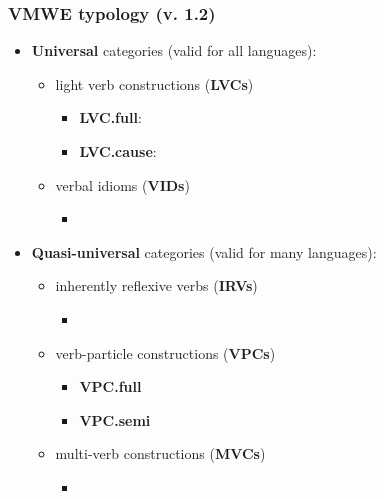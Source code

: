 \documentclass[xcolor=dvipsnames]{beamer}
\begin{document}
\begin{frame}
\begin{frame}
  \vspace*{-5pt}
  \frametitle{VMWE typology (v. 1.2)}

\begin{scriptsize}
\begin{block}{}
\begin{itemize}
\item \textbf{Universal} categories (valid for all languages):
   \begin{itemize}
   \item light verb constructions (\textbf{LVCs})
	\begin{itemize}
	\item \textbf{LVC.full}:  
	\item \textbf{LVC.cause}:  
	\end{itemize}
   \item verbal idioms (\textbf{VIDs})
	\begin{itemize}
	\item[]  
	\end{itemize}
   \end{itemize}
\item \textbf{Quasi-universal} categories (valid for many languages):
   \begin{itemize}
   \item inherently reflexive verbs (\textbf{IRVs})
	\begin{itemize}
	\item[]  
	\end{itemize}
   \item verb-particle constructions (\textbf{VPCs})
	\begin{itemize}
	\item \textbf{VPC.full}  
	\item \textbf{VPC.semi}  
	\end{itemize}
   \item multi-verb constructions (\textbf{MVCs})
	\begin{itemize}
	\item[]  
	\end{itemize}
   \end{itemize}

\end{itemize}
\end{block}
\end{scriptsize}
\end{frame}
\end{frame}
\end{document}

